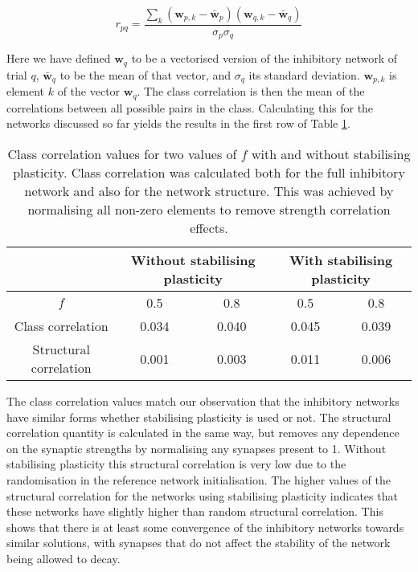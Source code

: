 \documentclass[12pt, a4paper]{article}
\begin{document}
    \begin{equation}  r_{pq} = \frac{\sum_k (\mathbf{w}_{p,k} - \mathbf{\bar{w}}_p)(\mathbf{w}_{q,k} - \mathbf{\bar{w}}_q)}{\sigma_p \sigma_q}      \end{equation}

Here we have defined $\mathbf{w}_q$ to be a vectorised version of the inhibitory network of trial $q$, $\mathbf{\bar{w}}_q$ to be the mean of that vector, and $\sigma_q$ its standard deviation.  $\mathbf{w}_{p,k}$ is element $k$ of the vector $\mathbf{w}_q$.  The class correlation is then the mean of the correlations between all possible pairs in the class.  Calculating this for the networks discussed so far yields the results in the first row of Table \ref{tab:res1}. 

\begin{table}
    \centering
            \begin{tabular}{|c | c c c c|}
                \hline
                                            & \multicolumn{2}{|c|}{Without stabilising plasticity} & \multicolumn{2}{|c|}{With stabilising plasticity} \\
                \hline
                   $f$                       &  0.5       &  0.8    &  0.5     &  0.8 \\
                \hline
                Class correlation            &    0.034  &  0.040   &   0.045  &  0.039 \\
                Structural correlation &   0.001   &  0.003   &  0.011   &  0.006 \\
                \hline
            \end{tabular}
            \caption{Class correlation values for two values of $f$ with and without stabilising plasticity.  Class correlation was calculated both for the full inhibitory network and also for the network structure.  This was achieved by normalising all non-zero elements to remove strength correlation effects.\label{tab:res1}}
\end{table}

The class correlation values match our observation that the inhibitory networks have similar forms whether stabilising plasticity is used or not.  The structural correlation quantity is calculated in the same way, but removes any dependence on the synaptic strengths by normalising any synapses present to 1.  Without stabilising plasticity this structural correlation is very low due to the randomisation in the reference network initialisation.  The higher values of the structural correlation for the networks using stabilising plasticity indicates that these networks have slightly higher than random structural correlation.  This shows that there is at least some convergence of the inhibitory networks towards similar solutions, with synapses that do not affect the stability of the network being allowed to decay.
\end{document}
